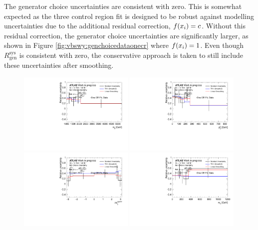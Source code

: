 The generator choice uncertainties are consistent with zero. This is somewhat expected as the three control region fit is designed to be robust against modelling uncertainties due to the additional residual correction, $f(x_i)=c$. Without this residual correction, the generator choice uncertainties are significantly larger, as shown in Figure \ref{fig:vbswy:genchoicedataonecr} where $f(x_i)=1$. Even though $R_{\text{gen}}^{\text{sys}}$ is consistent with zero, the conservative approach is taken to still include these uncertainties after smoothing.

\begin{figure}[t]
  \centering
  \includegraphics[width=0.49\textwidth]{plots/diffx/genchoice/data/sys_errors_mjj_generator_choice_1cr.pdf}
  \includegraphics[width=0.49\textwidth]{plots/diffx/genchoice/data/sys_errors_jj_pt_generator_choice_1cr.pdf}
  \includegraphics[width=0.49\textwidth]{plots/diffx/genchoice/data/sys_errors_jj_dphi_generator_choice_1cr.pdf}
  \includegraphics[width=0.49\textwidth]{plots/diffx/genchoice/data/sys_errors_ly_m_generator_choice_1cr.pdf}

\end{figure}
